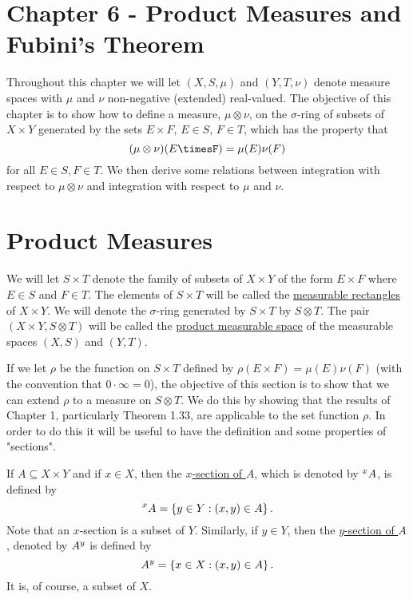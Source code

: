 
\section{Chapter 6 - Product Measures and Fubini's Theorem}

Throughout this chapter we will let $(X,S,\mu)$ and $(Y,T,\nu)$ denote measure spaces with $\mu$ and $\nu$ non-negative (extended) real-valued. The objective of this chapter is to show how to define a measure, $\mu\otimes\nu$, on the $\sigma$-ring of subsets of $X\times Y$ generated by the sets $E\times F$, $E\in S$, $F\in T$, which has the property that $$(\mu\otimes\nu)(E\timesF)=\mu(E)\nu(F)$$ for all $E\in S,F\in T$. We then derive some relations between integration with respect to $\mu\otimes\nu$ and integration with respect to $\mu$ and $\nu$.

\section{Product Measures}

\begin{definition}
We will let $S\times T$ denote the family of subsets of $X\times Y$ of the form $E\times F$ where $E\in S$ and $F\in T$. The elements of $S\times T$ will be called the \underline{measurable rectangles} of $X\times Y$. We will denote the $\sigma$-ring generated by $S\times T$ by $S\otimes T$. The pair $(X\times Y,S\otimes T)$ will be called the \underline{product measurable space} of the measurable spaces $(X,S)$ and $(Y,T)$.
\end{definition}

If we let $\rho$ be the function on $S\times T$ defined by $\rho(E\times F)=\mu(E)\nu(F)$ (with the convention that $0\cdot\infty=0$), the objective of this section is to show that we can extend $\rho$ to a measure on $S\otimes T$. We do this by showing that the results of Chapter 1, particularly Theorem 1.33, are applicable to the set function $\rho$. In order to do this it will be useful to have the definition and some properties of "sections".

\begin{definition}
If $A\subseteq X\times Y$ and if $x\in X$, then the \underline{$x$-section of $A$}, which is denoted by $\xsec{A}{x}$, is defined by $$\xsec{A}{x}=\brc{y\in Y:(x, y)\in A}.$$ Note that an $x$-section is a subset of $Y$. Similarly, if $y\in Y$, then the \underline{$y$-section of $A$}, denoted by $\ysec{A}{y}$ is defined by $$\ysec{A}{y}=\brc{x\in X:(x,y)\in A}.$$ It is, of course, a subset of $X$.
\end{definition}

